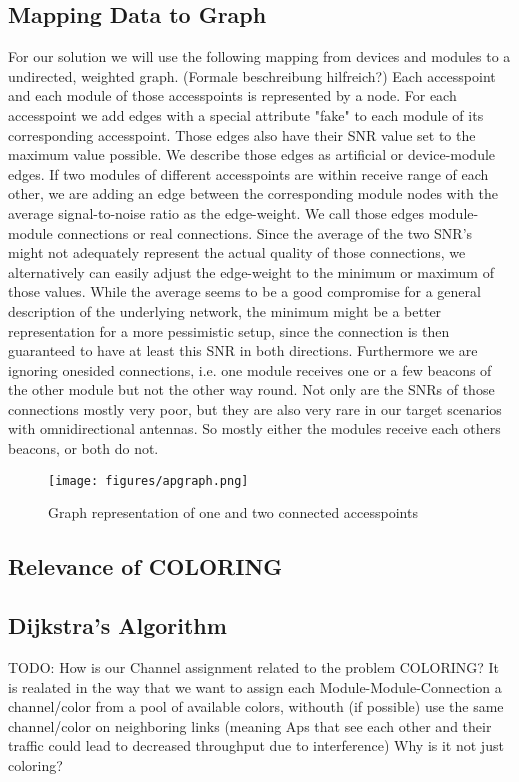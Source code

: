    \subsection{Mapping Data to Graph}
    For our solution we will use the following mapping from devices and modules to a undirected, weighted graph. (Formale beschreibung hilfreich?)
    Each accesspoint and each module of those accesspoints is represented by a node.
    For each accesspoint we add edges with a special attribute "fake" to each module of its corresponding accesspoint. Those edges also have their SNR value set to 
    the maximum value possible. We describe those edges as artificial or device-module edges.
    If two modules of different accesspoints are within receive range of each other, 
    we are adding an edge between the corresponding module nodes with the average signal-to-noise ratio as the edge-weight.
    We call those edges module-module connections or real connections.
    Since the average of the two SNR's might not adequately represent the actual quality of those connections,
    we alternatively can easily adjust the edge-weight to the minimum or maximum of those values.
    While the average seems to be a good compromise for a general description of the underlying network, the minimum might be a better representation for 
    a more pessimistic setup, since the connection is then guaranteed to have at least this SNR in both directions. 
    Furthermore we are ignoring onesided connections, i.e. one module receives one or a few beacons of the other module but not the other way round.
    Not only are the SNRs of those connections mostly very poor, but they are also very rare in our target scenarios with omnidirectional antennas.
    So mostly either the modules receive each others beacons, or both do not.
    \begin{figure}[t]
      \centering
      \texttt{[image: figures/apgraph.png]}
      \caption{Graph representation of one and two connected accesspoints}
      \label{fig:apgraph}
    \end{figure}
   \subsection{Relevance of COLORING}
   \subsection{Dijkstra's Algorithm}
   TODO: How is our Channel assignment related to the problem COLORING?
    It is realated in the way that we want to assign each Module-Module-Connection a channel/color from a pool of available colors, withouth (if possible) use the same channel/color on neighboring links (meaning Aps that see each other and their traffic could lead to decreased throughput due to interference)
    Why is it not just coloring?

